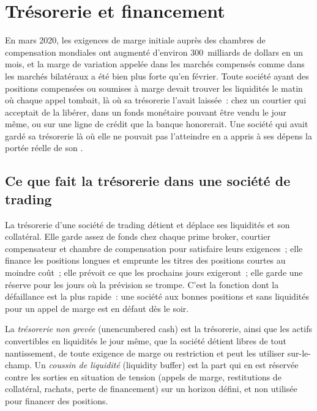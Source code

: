 \chapter{Trésorerie et financement}\label{ch:fm:treasury-and-funding}

En mars 2020, les exigences de marge initiale auprès des chambres de compensation mondiales ont augmenté d'environ 300~milliards de dollars en un mois, et la marge de variation appelée
dans les marchés compensés comme dans les marchés bilatéraux a été bien plus forte qu'en février. Toute société ayant des positions compensées ou soumises à marge devait trouver les liquidités le
matin où chaque appel tombait, là où sa trésorerie l'avait laissée~: chez un courtier qui acceptait de la libérer, dans un fonds monétaire pouvant
être vendu le jour même, ou sur une ligne de crédit que la banque honorerait. Une société qui avait gardé sa trésorerie là où elle ne pouvait pas l'atteindre
en a appris à ses dépens la portée réelle de son .

\section{Ce que fait la trésorerie dans une société de trading}

La trésorerie d'une société de trading détient et déplace ses liquidités et son collatéral. Elle garde assez de fonds chez chaque prime broker, courtier compensateur et chambre de compensation pour
satisfaire leurs exigences~; elle finance les positions longues et emprunte les titres des positions courtes au moindre coût~; elle prévoit ce que les prochains jours
exigeront~; elle garde une réserve pour les jours où la prévision se trompe. C'est la fonction dont la défaillance est la plus rapide~: une société aux bonnes positions et
sans liquidités pour un appel de marge est en défaut dès le soir.

\begin{definition}\label{def:fm:treasury-and-funding:cash}
La \emph{trésorerie non grevée} (unencumbered cash) est la trésorerie, ainsi que les actifs convertibles en liquidités le jour même, que la société détient libres de tout nantissement,
de toute exigence de marge ou restriction et peut les utiliser sur-le-champ. Un \emph{coussin de liquidité} (liquidity buffer) est la part qui en est réservée contre les sorties en situation de
tension (appels de marge, restitutions de collatéral, rachats, perte de financement) sur un horizon défini, et non utilisée pour financer des positions.
\end{definition}


